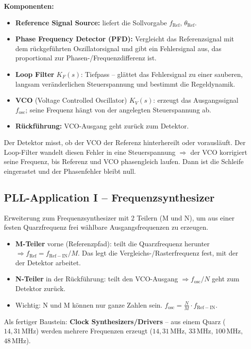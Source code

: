 \documentclass[11pt,a4paper]{article}
\begin{document}
\textbf{Komponenten:}
\begin{itemize}
    \item \textbf{Reference Signal Source:} liefert die Sollvorgabe $f_\mathrm{Ref}$, $\theta_\mathrm{Ref}$.
    \item \textbf{Phase Frequency Detector (PFD):} Vergleicht das Referenzsignal mit dem rückgeführten Oszillatorsignal und gibt ein Fehlersignal aus, das proportional zur Phasen-/Frequenzdifferenz ist.
    \item \textbf{Loop Filter} $K_F(s)$: Tiefpass -- glättet das Fehlersignal zu einer sauberen, langsam veränderlichen Steuerspannung und bestimmt die Regeldynamik.
    \item \textbf{VCO} (Voltage Controlled Oscillator) $K_V(s)$: erzeugt das Ausgangssignal $f_\mathrm{osc}$; seine Frequenz hängt von der angelegten Steuerspannung ab.
    \item \textbf{Rückführung:} VCO-Ausgang geht zurück zum Detektor.
\end{itemize}

Der Detektor misst, ob der VCO der Referenz hinterhereilt oder vorausläuft. Der Loop-Filter wandelt diesen Fehler in eine Steuerspannung $\Rightarrow$ der VCO korrigiert seine Frequenz, bis Referenz und VCO phasengleich laufen. Dann ist die Schleife eingerastet und der Phasenfehler bleibt null.

\subsection{PLL-Application I -- Frequenzsynthesizer}
Erweiterung zum Frequenzsynthesizer mit 2 Teilern (M und N), um aus einer festen Quarzfrequenz frei wählbare Ausgangsfrequenzen zu erzeugen.

\begin{itemize}
    \item \textbf{M-Teiler} vorne (Referenzpfad): teilt die Quarzfrequenz herunter $\Rightarrow f_\mathrm{Ref} = f_\mathrm{Ref-IN}/M$. Das legt die Vergleichs-/Rasterfrequenz fest, mit der der Detektor arbeitet.
    \item \textbf{N-Teiler} in der Rückführung: teilt den VCO-Ausgang $\Rightarrow f_\mathrm{osc}/N$ geht zum Detektor zurück.
    \item Wichtig: N und M können nur ganze Zahlen sein. $f_\mathrm{osc} = \frac{N}{M} \cdot f_\mathrm{Ref-IN}$.
\end{itemize}

Als fertiger Baustein: \textbf{Clock Synthesizers/Drivers} -- aus einem Quarz ($14{,}31\,\text{MHz}$) werden mehrere Frequenzen erzeugt ($14{,}31\,\text{MHz}$, $33\,\text{MHz}$, $100\,\text{MHz}$, $48\,\text{MHz}$).
\end{document}
